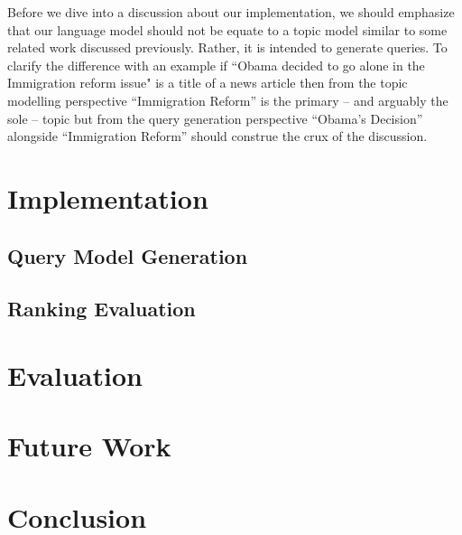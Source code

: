 \documentclass[article]{IEEEtran}
\begin{document}
Before we dive into a discussion about our implementation, we should emphasize that our language model should not be equate to a topic model similar to some related work discussed previously. Rather, it is intended to generate queries. To clarify the difference with an example if ``Obama decided to go alone in the Immigration reform issue" is a title of a news article then from the topic modelling perspective ``Immigration Reform'' is the primary -- and arguably the sole -- topic but from the query generation perspective ``Obama's Decision'' alongside ``Immigration Reform'' should construe the crux of the discussion.    

\section{Implementation}
\label{imp}
\subsection{Query Model Generation}
\subsection{Ranking Evaluation}

\section{Evaluation}
\label{ev}

\section{Future Work}
\label{fw}
 
\section{Conclusion}
\label{con}

\nocite{titov2008modeling, ma2012topic, das2014going, blei2003modeling}

 
\end{document}
